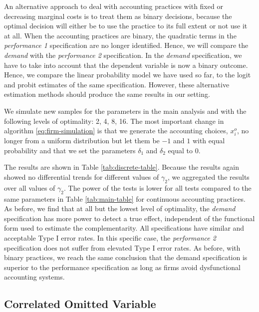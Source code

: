 \documentclass[12pt]{article}
\begin{document}
An alternative approach to deal with accounting practices with fixed or decreasing marginal costs is to treat them as binary decisions, because the optimal decision will either be to use the practice to its full extent or not use it at all. When the accounting practices are binary, the quadratic terms in the \emph{performance 1} specification are no longer identified. Hence, we will compare the \emph{demand} with the \emph{performance 2} specification. In the \emph{demand} specification, we have to take into account that the dependent variable is now a binary outcome. Hence, we compare the linear probability model we have used so far, to the logit and probit estimates of the same specification. However, these alternative estimation methods should produce the same results in our setting. 

We simulate new samples for the parameters in the main analysis and with the following levels of optimality: 2, 4, 8, 16. The most important change in algorithm \eqref{eq:firm-simulation} is that we generate the accounting choices, $x_i^o$, no longer from a uniform distribution but let them be $-1$ and $1$ with equal probability and that we set the parameters $\delta_1$ and $\delta_2$ equal to $0$.

The results are shown in Table \ref{tab:discrete-table}. Because the results again showed no differential trends for different values of $\gamma_2$, we aggregated the results over all values of $\gamma_2$. The power of the tests is lower for all tests compared to the same parameters in Table \ref{tab:main-table} for continuous accounting practices. As before, we find that at all but the lowest level of optimality, the \emph{demand} specification has more power to detect a true effect, independent of the functional form used to estimate the complementarity. All specifications have similar and acceptable Type I error rates. In this specific case, the \emph{performance 2} specification does not suffer from elevated Type I error rates. As before, with binary practices, we reach the same conclusion that the demand specification is superior to the performance specification as long as firms avoid dysfunctional accounting systems. 



\subsection{Correlated Omitted Variable}\label{correlated-omitted}
\end{document}
